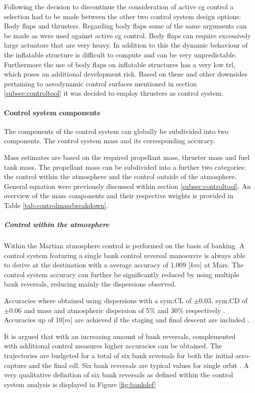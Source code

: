 Following the decision to discontinue the consideration of active \gls{cg} control a selection had to be made between the other two control system design options: Body flaps and thrusters. Regarding body flaps some of the same arguments can be made as were used against active \gls{cg} control. Body flaps can require excessively large actuators that are very heavy. In addition to this the dynamic behaviour of the inflatable structure is difficult to compute and can be very unpredictable. Furthermore the use of body flaps on inflatable structures has a very low \acrlong{trl}, which poses an additional development risk. Based on these and other downsides pertaining to aerodynamic control surfaces mentioned in section \ref{subsec:controltool} it was decided to employ thrusters as control system.

\paragraph{Control system components}

The components of the control system can  globally be subdivided into two components. The control system mass and its corresponding accuracy.

Mass estimates are based on the required propellant mass, thruster mass and fuel tank mass. The propellant mass can be subdivided into a further two categories: the control within the atmosphere and the control outside of the atmosphere. General equation were previously discussed within section \ref{subsec:controltool}. An overview of the mass components and their respective weights is provided in Table \ref{tab:controlmassbreakdown}.

\subparagraph{Control within the atmosphere} 

Within the Martian atmosphere control is performed on the basis of banking. A control system featuring a single bank control reversal manoeuvre is always able to derive at the destination with a average accuracy of 1.009 [$km$]\cite{Lu2007} at Mars. The control system accuracy can further be significantly reduced by using multiple bank reversals, reducing mainly the dispersions observed. 

Accuracies where obtained using dispersions with a \gls{sym:CL} of $\pm 0.03 $, \gls{sym:CD}  of $\pm 0.06 $ and mass and atmospheric dispersion of 5\% and 30\% respectively \cite{Lu2007}. Accuracies up of 10[$m$] are achieved if the staging and final descent are included \cite{Davis2010}. 

It is argued that with an increasing amount of bank reversals, complemented with additional control measures higher accuracies can be obtained. The trajectories are budgeted for a total of six bank reversals for both the initial aero-capture and the final \gls{edl}. Six bank reversals are typical values for single orbit \cite{Lu2007, Cianciolo2010}. A very qualitative definition of six bank reversals as defined within the control system analysis is displayed in Figure \ref{fig:bankdef}

